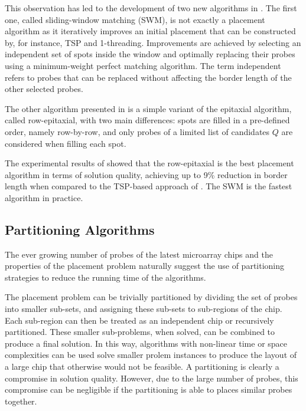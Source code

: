 \documentclass{bioinfo}
\begin{document}
This observation has led to the development of two new algorithms in \citealp{KAHNG03_1}. The first one, called sliding-window matching (SWM), is not exactly a placement algorithm as it iteratively improves an initial placement that can be constructed by, for instance, TSP and 1-threading. Improvements are achieved by selecting an independent set of spots inside the window and optimally replacing their probes using a minimum-weight perfect matching algorithm. The term independent refers to probes that can be replaced without affecting the border length of the other selected probes.

The other algorithm presented in \citealp{KAHNG03_1} is a simple variant of the epitaxial algorithm, called row-epitaxial, with two main differences: spots are filled in a pre-defined order, namely row-by-row, and only probes of a limited list of candidates $Q$ are considered when filling each spot.

The experimental results of \citealp{KAHNG03_1} showed that the row-epitaxial is the best placement algorithm in terms of solution quality, achieving up to 9\% reduction in border length when compared to the TSP-based approach of \citealp{HANNENHALLI02}. The SWM is the fastest algorithm in practice.

\subsection{Partitioning Algorithms}
\label{sec:partition}

The ever growing number of probes of the latest microarray chips and the  properties of the placement problem naturally suggest the use of partitioning strategies to reduce the running time of the algorithms.

The placement problem can be trivially partitioned by dividing the set of probes into smaller sub-sets, and assigning these sub-sets to sub-regions of the chip. Each sub-region can then be treated as an independent chip or recursively partitioned. These smaller sub-problems, when solved, can be combined to produce a final solution. In this way, algorithms with non-linear time or space complexities can be used solve smaller prolem instances to produce the layout of a large chip that otherwise would not be feasible. A partitioning is clearly a compromise in solution quality. However, due to the large number of probes, this compromise can be negligible if the partitioning is able to places similar probes together.
\end{document}
